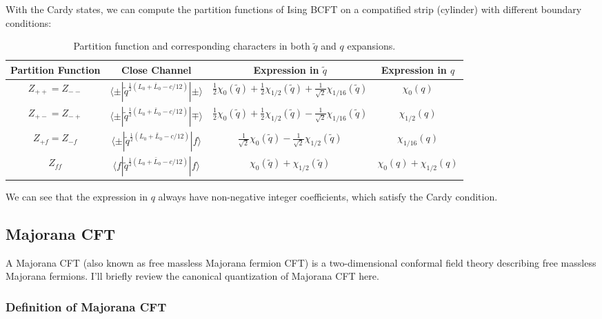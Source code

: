 With the Cardy states, we can compute the partition functions of Ising BCFT on a compatified strip (cylinder) with different boundary conditions:
\begin{table}[H]
\centering
\renewcommand{\arraystretch}{1.6}
\begin{tabular}{cccc}
\hline\hline
Partition Function & Close Channel & Expression in $\tilde q$ & Expression in $q$ \\
\hline\hline

$Z_{++} = Z_{--}$ 
& $\langle \pm | \tilde{q}^{\frac12(L_0+\bar L_0 - c/12)} | \pm \rangle$
& $\frac12 \chi_0(\tilde q) + \frac12 \chi_{1/2}(\tilde q) + \frac{1}{\sqrt{2}} \chi_{1/16}(\tilde q)$
& $\chi_0(q)$
\\

$Z_{+-} = Z_{-+}$ 
& $\langle \pm | \tilde{q}^{\frac12(L_0+\bar L_0 - c/12)} | \mp \rangle$
& $\frac12 \chi_0(\tilde q) + \frac12 \chi_{1/2}(\tilde q) - \frac{1}{\sqrt{2}} \chi_{1/16}(\tilde q)$
& $\chi_{1/2}(q)$
\\

$Z_{+f} = Z_{-f}$
& $\langle \pm | \tilde{q}^{\frac12(L_0+\bar L_0 - c/12)} | f \rangle$
& $\frac{1}{\sqrt{2}} \chi_0(\tilde q) - \frac{1}{\sqrt{2}} \chi_{1/2}(\tilde q)$
& $\chi_{1/16}(q)$
\\

$Z_{ff}$
& $\langle f | \tilde{q}^{\frac12(L_0+\bar L_0 - c/12)} | f \rangle$
& $\chi_0(\tilde q) + \chi_{1/2}(\tilde q)$
& $\chi_0(q) + \chi_{1/2}(q)$
\\

\hline\hline
\end{tabular}
\caption{Partition function and corresponding characters in both $\tilde q$ and $q$ expansions.}
\label{tab:ising_partition_functions}
\end{table}

We can see that the expression in $ q $ always have non-negative integer coefficients, which satisfy the Cardy condition.


\subsection{Majorana CFT}
A Majorana CFT (also known as free massless Majorana fermion CFT) is a two-dimensional conformal field theory describing free massless Majorana fermions. I'll briefly review the canonical quantization of Majorana CFT here. 

\subsubsection{Definition of Majorana CFT}


